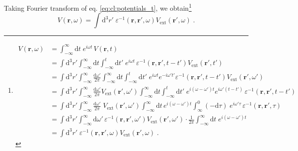 \documentclass[a4paper,12pt]{article}
\begin{document}
    Taking Fourier transform of eq. \eqref{eq:cl:potentials_t}, we obtain\footnote{ %
\begin{equation*}
\begin{aligned}
    V(\mathbf{r}, \omega) 
        &= \int_{-\infty}^{\infty}\!\!\!\! \text{d}t \; e^{i\omega t}\, V(\mathbf{r}, t) \\
        &= \int\!\! \text{d}^3 r' \!\!
           \int_{-\infty}^{\infty}\!\!\!\! \text{d}t 
           \int_{-\infty}^{t}\!\!\!\! \text{d} t' \;
           e^{i\omega t}\, \varepsilon^{-1}(\mathbf{r}, \mathbf{r'}, t - t') V_\text{ext}(\mathbf{r'}, t') \\
        &= \int\!\! \text{d}^3 r' \!\!
           \int_{-\infty}^{\infty}\! \frac{\text{d}\omega'}{2\pi} 
           \int_{-\infty}^{\infty}\!\!\!\! \text{d}t
           \int_{-\infty}^{t}\!\!\!\! \text{d}t' \;
           e^{i\omega t}e^{-i\omega' t'} \varepsilon^{-1}(\mathbf{r}, \mathbf{r'}, t - t') V_\text{ext}(\mathbf{r'}, \omega') \\
        &= \int\!\! \text{d}^3 r' \!\!
           \int_{-\infty}^{\infty}\! \frac{\text{d}\omega'}{2\pi} V_\text{ext}(\mathbf{r'}, \omega')
           \int_{-\infty}^{\infty}\!\!\!\! \text{d}t
           \int_{-\infty}^{t}\!\!\!\! \text{d}t' \;
           e^{i(\omega - \omega')t}e^{i\omega' (t - t')} \, \varepsilon^{-1}(\mathbf{r}, \mathbf{r'}, t - t')  \\
        &= \int\!\! \text{d}^3 r' \!\!
           \int_{-\infty}^{\infty}\! \frac{\text{d}\omega'}{2\pi} \; V_\text{ext}(\mathbf{r'}, \omega')
           \int_{-\infty}^{\infty}\!\!\!\! \text{d}t \, e^{i(\omega - \omega')t}
           \int_{\infty}^{0}\!\! (-\text{d}\tau) \;
           e^{i\omega' \tau} \, \varepsilon^{-1}(\mathbf{r}, \mathbf{r'}, \tau)  \\
        &= \int\!\! \text{d}^3 r' \!\!
           \int_{-\infty}^{\infty} \!\!\!\! \text{d}\omega' \,
           \varepsilon^{-1}(\mathbf{r}, \mathbf{r'}, \omega') V_\text{ext}(\mathbf{r'}, \omega')
           \cdot \frac{1}{2\pi}\int_{-\infty}^{\infty}\!\! \text{d}t \; e^{i(\omega - \omega')t} \\
        &= \int\!\! \text{d}^3 r' \;
           \varepsilon^{-1}(\mathbf{r}, \mathbf{r'}, \omega) V_\text{ext}(\mathbf{r'}, \omega)\; .
\end{aligned}
\end{equation*}
}
    \begin{equation} \label{eq:cl:potentials_w}
        V(\mathbf{r}, \omega) 
            = \int\!\! \text{d}^3 r' \; \varepsilon^{-1}(\mathbf{r}, \mathbf{r'}, \omega) V_\text{ext}(\mathbf{r'}, \omega)\; .
    \end{equation}
\end{document}
